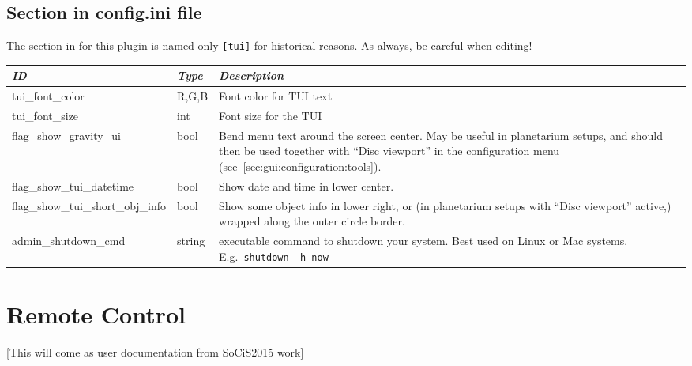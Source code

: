 \subsection{Section  in config.ini file}
\label{sec:plugins:TUI:config}

The section in  for this plugin is named only \texttt{[tui]} for historical reasons. As always, be careful when editing!

\begin{longtabu} to \textwidth {l|l|X}\toprule
\emph{ID}            & \emph{Type} & \emph{Description}\\\midrule
tui\_font\_color     & R,G,B & Font color for TUI text \\\midrule
tui\_font\_size      & int   & Font size for the TUI \\\midrule
flag\_show\_gravity\_ui           &bool&Bend menu text around the screen center. 
                                        May be useful in planetarium setups, and should then be used together with ``Disc viewport'' 
                                        in the configuration menu (see~\ref{sec:gui:configuration:tools}). \\\midrule
flag\_show\_tui\_datetime         &bool&Show date and time in lower center.\\\midrule
flag\_show\_tui\_short\_obj\_info &bool&Show some object info in lower right, or (in planetarium setups with ``Disc viewport'' active,) wrapped along the outer circle border. \\\midrule
admin\_shutdown\_cmd              &string& executable command to shutdown your system. Best used on Linux or Mac systems. E.g.\ \texttt{shutdown -h now}\\\bottomrule
\end{longtabu}



\newpage
\section{Remote Control}
\label{sec:plugin:RemoteControl}

[This will come as user documentation from SoCiS2015 work]


% 


